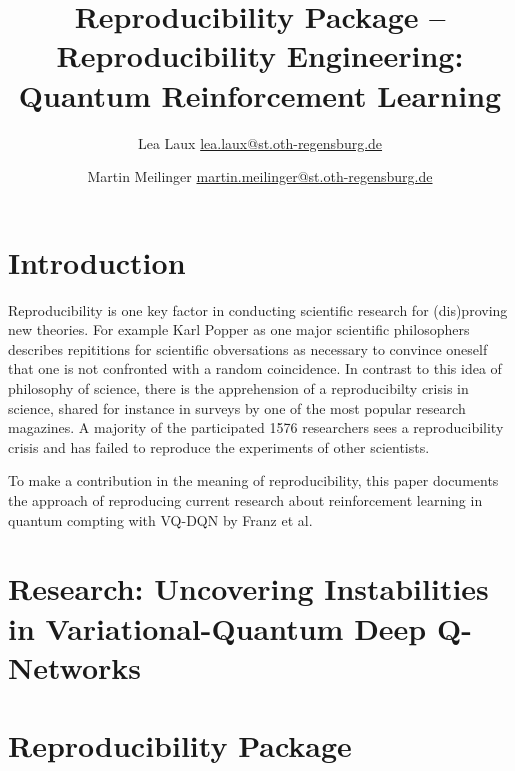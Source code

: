 \documentclass[conference]{IEEEtran}
\title{Reproducibility Package -- Reproducibility Engineering: Quantum Reinforcement Learning}
\author{Lea Laux \href{mailto:lea.laux@st.oth-regensburg.de}{lea.laux@st.oth-regensburg.de}  \and 
 Martin Meilinger \href{mailto:martin.meilinger@st.oth-regensburg.de}{martin.meilinger@st.oth-regensburg.de}}
\begin{document}
\begin{acronym}
\end{acronym}

\maketitle

\section{Introduction}
Reproducibility is one key factor in conducting scientific research for (dis)proving new theories. 
For example Karl Popper as one major scientific philosophers describes repititions for scientific obversations as necessary to convince oneself that one is not confronted with a random coincidence.\autocite{popper} 
In contrast to this idea of philosophy of science, there is the apprehension of a reproducibilty crisis in science, shared for instance in surveys by one of the most popular research magazines. 
A majority of the participated 1576 researchers sees a reproducibility crisis and has failed to reproduce the experiments of other scientists.\autocite{crisis}

To make a contribution in the meaning of reproducibility, this paper documents the approach of reproducing current research about reinforcement learning in quantum compting with \ac{VQ-DQN} by Franz et al.\autocite{instabilities}


\section{Research: Uncovering Instabilities in Variational-Quantum Deep Q-Networks}

\section{Reproducibility Package}

\printbibliography
\end{document}
